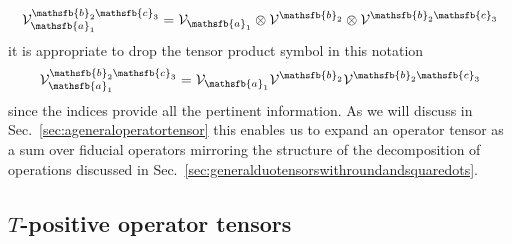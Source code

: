 \documentclass[10pt]{article}
\begin{document}
\begin{equation}
\mathcal{V}_{\mathsfb{a}_1}^{\mathsfb{b}_2\mathsfb{c}_3} = \mathcal{V}_{\mathsfb{a}_1}\otimes \mathcal{V}^{\mathsfb{b}_2} \otimes \mathcal{V}^{\mathsfb{b}_2\mathsfb{c}_3}
\end{equation}
it is appropriate to drop the tensor product symbol in this notation
\begin{equation}
\mathcal{V}_{\mathsfb{a}_1}^{\mathsfb{b}_2\mathsfb{c}_3} = \mathcal{V}_{\mathsfb{a}_1} \mathcal{V}^{\mathsfb{b}_2}  \mathcal{V}^{\mathsfb{b}_2\mathsfb{c}_3}
\end{equation}
since the indices provide all the pertinent information.    As we will discuss in Sec.\ \ref{sec:ageneraloperatortensor} this enables us to expand an operator tensor as a sum over fiducial operators mirroring the structure of the decomposition of operations discussed in Sec.\ \ref{sec:generalduotensorswithroundandsquaredots}.

\subsection{$T$-positive operator tensors}\label{sec:Tpositiveoperatortensors}
\end{document}
